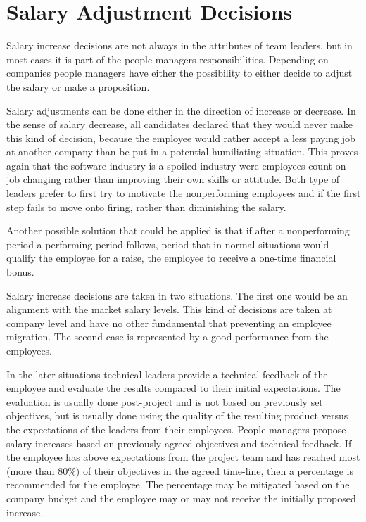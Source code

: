 \section{Salary Adjustment Decisions}
\label{sec:salary}
Salary increase decisions are not always in the attributes of team leaders, but in most cases it is part of the people managers responsibilities. Depending on companies people managers have either the possibility to either decide to adjust the salary or make a proposition.

Salary adjustments can be done either in the direction of increase or decrease. In the sense of salary decrease, all candidates declared that they would never make this kind of decision, because the employee would rather accept a less paying job at another company than be put in a potential humiliating situation. This proves again that the software industry is a spoiled industry were employees count on job changing rather than improving their own skills or attitude. Both type of leaders prefer to first try to motivate the nonperforming employees and if the first step fails to move onto firing, rather than diminishing the salary. 

Another possible solution that could be applied is that if after a nonperforming period a performing period follows, period that in normal situations would qualify the employee for a raise, the employee to receive a one-time financial bonus.

Salary increase decisions are taken in two situations. The first one would be an alignment with the market salary levels. This kind of decisions are taken at company level and have no other fundamental that preventing an employee migration. The second case is represented by a good performance from the employees.

In the later situations technical leaders provide a technical feedback of the employee and evaluate the results compared to their initial expectations. The evaluation is usually done post-project and is not based on previously set objectives, but is usually done using the quality of the resulting product versus the expectations of the leaders from their employees. People managers propose salary increases based on previously agreed objectives and technical feedback. If the employee has above expectations from the project team and has reached most (more than 80\%) of their objectives in the agreed time-line, then a percentage is recommended for the employee. The percentage may be mitigated based on the company budget and the employee may or may not receive the initially proposed increase.

